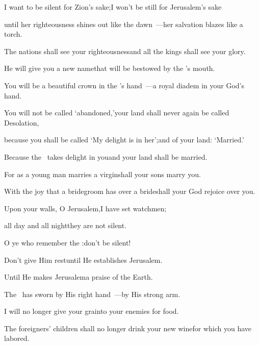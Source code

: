
\begin{inparaenum}
  \pb{} I want to be silent for Zion's sake;\pa{}I won't be still for Jerusalem's sake%

  \pc{}until her righteousness shines out like the dawn~---\pa{}her salvation blazes like a torch.%

  \pb{} The nations shall see your righteousness\pa{}and all the kings shall see your glory.%

  \pc{}He will give you a new name\pa{}that will be bestowed by the \lord's mouth.%

  \pb{} You will be a beautiful crown in the \lord's hand~---\pa{}a royal diadem in your God's hand.%

  \pb{} You will not be called `abandoned,'\pa{}your land shall never again be called Desolation,%

  \pc{}because you shall be called `My delight is in her';\pa{}and of your land: `Married.'%

  \pc{}Because the \lord\ takes delight in you\pa{}and your land shall be married.%

  \pb{} For as a young man marries a virgin\pa{}shall your sons marry you.%

  \pc{}With the joy that a bridegroom has over a bride\pa{}shall your God rejoice over you.

  \pa{} Upon your walls, O Jerusalem,\pa{}I have set watchmen;%

  \pc{}all day and all night\pa{}they are not silent.%

  \pc{}O ye who remember the \lord:\pa{}don't be silent!%

  \pb{} Don't give Him rest\pa{}until He establishes Jerusalem.%

  \pc{}Until He makes Jerusalem\pa{}a praise of the Earth.%

  \pc{} The \lord\ has sworn by His right hand~---\pa{}by His strong arm.%

  \pd{}I will no longer give your grain\pa{}to your enemies for food.%

  \pd{}The foreigners' children shall no longer drink your new wine\pa{}for which you have labored.%


\end{inparaenum}
